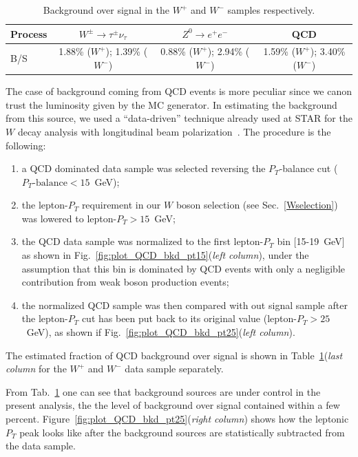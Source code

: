 \documentclass[12pt]{article}
\begin{document}
\begin{table}[htbp]
\centering
\begin{tabular}{| l | c | c  |  c |}
\hline
Process & $W^{\pm}\rightarrow \tau^{\pm} \nu_{\tau}$ & $Z^{0} \rightarrow e^{+}e^{-}$ & QCD \\
\hline
B/S & 1.88\% ($W^{+}$); 1.39\% ($W^{-}$)&  0.88\% ($W^{+}$); 2.94\% ($W^{-}$)& 1.59\% ($W^{+}$); 3.40\% ($W^{-}$)\\
\hline
\end{tabular}
\caption{Background over signal in the $W^{+}$ and $W^{-}$ samples respectively.}
\label{Tab:BoS}
\end{table}

The case of background coming from QCD events is more peculiar since we canon trust the luminosity given by the MC generator. In estimating the background from this source, we used a ``data-driven'' technique already used at STAR for the $W$ decay analysis with longitudinal beam polarization~\cite{STAR_W_AL_2012-paper, STAR_W_AL_2012-note}. The procedure is the following:

\begin{enumerate}
   \item a QCD dominated data sample was selected reversing the $P_{T}$-balance cut ($P_{T}\text{-balance} < 15$~GeV);
   \item the lepton-$P_{T}$ requirement in our $W$ boson selection (see Sec.~\ref{Wselection}) was lowered to  lepton-$P_{T} > 15$~GeV;
   \item the QCD data sample was normalized to the first lepton-$P_{T}$ bin [15-19~GeV] as shown in Fig.~\ref{fig:plot_QCD_bkd_pt15}({\it left column}), under the assumption that this bin is dominated by QCD events with only a negligible contribution from weak boson production events;
   \item the normalized QCD sample was then compared with out signal sample after the lepton-$P_{T}$ cut has been put back to its original value (lepton-$P_{T} > 25$~GeV), as shown if Fig.~\ref{fig:plot_QCD_bkd_pt25}({\it left column}). 
\end{enumerate}


The estimated fraction of QCD background over signal is shown in Table~\ref{Tab:BoS}({\it last column} for the $W^{+}$ and $W^{-}$ data sample separately. 

From Tab.~\ref{Tab:BoS} one can see that background sources are under control in the present analysis, the the level of background over signal contained within a few percent. Figure~\ref{fig:plot_QCD_bkd_pt25}({\it right column}) shows how the leptonic $P_{T}$ peak looks like after the background sources are statistically subtracted from the data sample.
\end{document}
